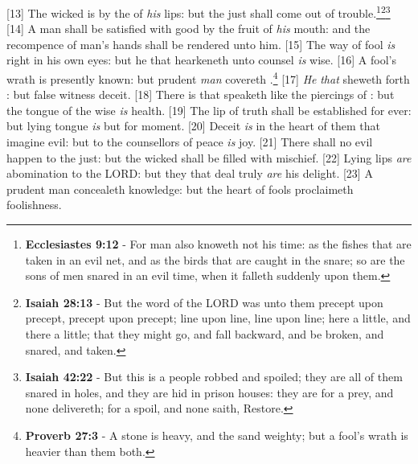 [13] \textcolor[cmyk]{0.99998,1,0,0}{The wicked is  by the  of \emph{his} lips: but the just shall come out of trouble.}\footnote{\textbf{Ecclesiastes 9:12} - For man also knoweth not his time: as the fishes that are taken in an evil net, and as the birds that are caught in the snare; so are the sons of men snared in an evil time, when it falleth suddenly upon them.}\footnote{\textbf{Isaiah 28:13} - But the word of the LORD was unto them precept upon precept, precept upon precept; line upon line, line upon line; here a little, and there a little; that they might go, and fall backward, and be broken, and snared, and taken.}\footnote{\textbf{Isaiah 42:22} - But this is a people robbed and spoiled; they are all of them snared in holes, and they are hid in prison houses: they are for a prey, and none delivereth; for a spoil, and none saith, Restore.}
[14] \textcolor[cmyk]{0.99998,1,0,0}{A man shall be satisfied with good by the fruit of \emph{his} mouth: and the recompence of  man's hands shall be rendered unto him.}
[15] \textcolor[cmyk]{0.99998,1,0,0}{The way of  fool \emph{is} right in his own eyes: but he that hearkeneth unto counsel \emph{is} wise.}
[16] \textcolor[cmyk]{0.99998,1,0,0}{A fool's wrath is presently known: but  prudent \emph{man} covereth .}\footnote{\textbf{Proverb 27:3}  -  A stone is heavy, and the sand weighty; but a fool’s wrath is heavier than them both.}
[17] \textcolor[cmyk]{0.99998,1,0,0}{\emph{He} \emph{that}  sheweth forth : but  false witness deceit.}
[18] \textcolor[cmyk]{0.99998,1,0,0}{There is that speaketh like the piercings of  : but the tongue of the wise \emph{is} health.}
[19] \textcolor[cmyk]{0.99998,1,0,0}{The lip of truth shall be established for ever: but  lying tongue \emph{is} but for  moment.}
[20] \textcolor[cmyk]{0.99998,1,0,0}{Deceit \emph{is} in the heart of them that imagine evil: but to the counsellors of peace \emph{is} joy.}
[21] \textcolor[cmyk]{0.99998,1,0,0}{There shall no evil happen to the just: but the wicked shall be filled with mischief.}
[22] \textcolor[cmyk]{0.99998,1,0,0}{Lying lips \emph{are} abomination to the LORD: but they that deal truly \emph{are} his delight.}
[23] \textcolor[cmyk]{0.99998,1,0,0}{A prudent man concealeth knowledge: but the heart of fools proclaimeth foolishness.}
